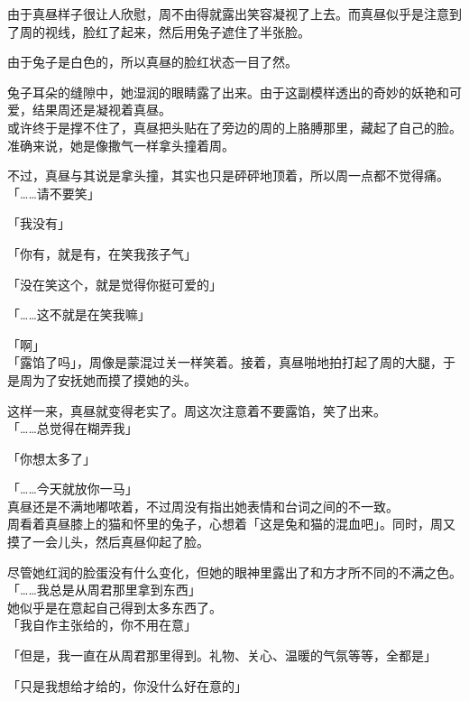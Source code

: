 由于真昼样子很让人欣慰，周不由得就露出笑容凝视了上去。而真昼似乎是注意到了周的视线，脸红了起来，然后用兔子遮住了半张脸。

由于兔子是白色的，所以真昼的脸红状态一目了然。

兔子耳朵的缝隙中，她湿润的眼睛露了出来。由于这副模样透出的奇妙的妖艳和可爱，结果周还是凝视着真昼。\\

或许终于是撑不住了，真昼把头贴在了旁边的周的上胳膊那里，藏起了自己的脸。准确来说，她是像撒气一样拿头撞着周。

不过，真昼与其说是拿头撞，其实也只是砰砰地顶着，所以周一点都不觉得痛。\\

「……请不要笑」

「我没有」

「你有，就是有，在笑我孩子气」

「没在笑这个，就是觉得你挺可爱的」

「……这不就是在笑我嘛」

「啊」\\

「露馅了吗」，周像是蒙混过关一样笑着。接着，真昼啪地拍打起了周的大腿，于是周为了安抚她而摸了摸她的头。

这样一来，真昼就变得老实了。周这次注意着不要露馅，笑了出来。\\

「……总觉得在糊弄我」

「你想太多了」

「……今天就放你一马」\\

真昼还是不满地嘟哝着，不过周没有指出她表情和台词之间的不一致。\\

周看着真昼膝上的猫和怀里的兔子，心想着「这是兔和猫的混血吧」。同时，周又摸了一会儿头，然后真昼仰起了脸。

尽管她红润的脸蛋没有什么变化，但她的眼神里露出了和方才所不同的不满之色。\\

「……我总是从周君那里拿到东西」\\

她似乎是在意起自己得到太多东西了。\\

「我自作主张给的，你不用在意」

「但是，我一直在从周君那里得到。礼物、关心、温暖的气氛等等，全都是」

「只是我想给才给的，你没什么好在意的」\\

